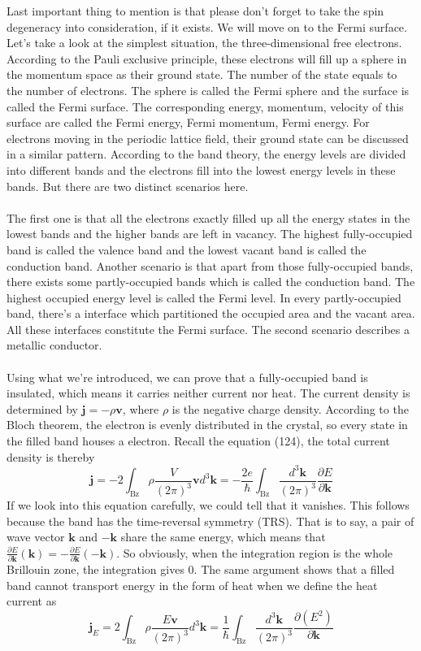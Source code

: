 \documentclass{article}
\begin{document}
Last important thing to mention is that please don't forget to take the spin degeneracy into consideration, if it exists. We will move on to the Fermi surface. Let's take a look at the simplest situation, the three-dimensional free electrons. According to the Pauli exclusive principle, these electrons will fill up a sphere in the momentum space as their ground state. The number of the state equals to the number of electrons. The sphere is called the Fermi sphere and the surface is called the Fermi surface. The corresponding energy, momentum, velocity of this surface are called the Fermi energy, Fermi momentum, Fermi energy. For electrons moving in the periodic lattice field, their ground state can be discussed in a similar pattern. According to the band theory, the energy levels are divided into different bands and the electrons fill into the lowest energy levels in these bands. But there are two distinct scenarios here.\\
\\
The first one is that all the electrons exactly filled up all the energy states in the lowest bands and the higher bands are left in vacancy. The highest fully-occupied band is called the valence band and the lowest vacant band is called the conduction band. Another scenario is that apart from those fully-occupied bands, there exists some partly-occupied bands which is called the conduction band. The highest occupied energy level is called the Fermi level. In every partly-occupied band, there's a interface which partitioned the occupied area and the vacant area. All these interfaces constitute the Fermi surface. The second scenario describes a metallic conductor.\\
\\
Using what we're introduced, we can prove that a fully-occupied band is insulated, which means it carries neither current nor heat. The current density is determined by $\mathbf{j}=-\rho\mathbf{v}$, where $\rho$ is the negative charge density. According to the Bloch theorem, the electron is evenly distributed in the crystal, so every state in the filled band houses a electron. Recall the equation (124), the total current density is thereby\begin{equation}
    \mathbf{j}=-2\int_\mathrm{Bz}\rho\frac{V}{(2\pi)^3}\mathbf{v}d^3\mathbf{k}=-\frac{2e}{\hbar}\int_\mathrm{Bz}\frac{d^3\mathbf{k}}{(2\pi)^3}\frac{\partial{E}}{\partial\mathbf{k}}
\end{equation}
If we look into this equation carefully, we could tell that it vanishes. This follows because the band has the time-reversal symmetry (TRS). That is to say, a pair of wave vector $\mathbf{k}$ and $-\mathbf{k}$ share the same energy, which means that $\frac{\partial{E}}{\partial\mathbf{k}}(\mathbf{k})=-\frac{\partial{E}}{\partial\mathbf{k}}(\mathbf{-k})$. So obviously, when the integration region is the whole Brillouin zone, the integration gives 0. The same argument shows that a filled band cannot transport energy in the form of heat when we define the heat current as\begin{equation}
    \mathbf{j}_E=2\int_\mathrm{Bz}\rho\frac{E\mathbf{v}}{(2\pi)^3}d^3\mathbf{k}=\frac1{\hbar}\int_\mathrm{Bz}\frac{d^3\mathbf{k}}{(2\pi)^3}\frac{\partial(E^2)}{\partial\mathbf{k}}
\end{equation}
\end{document}
